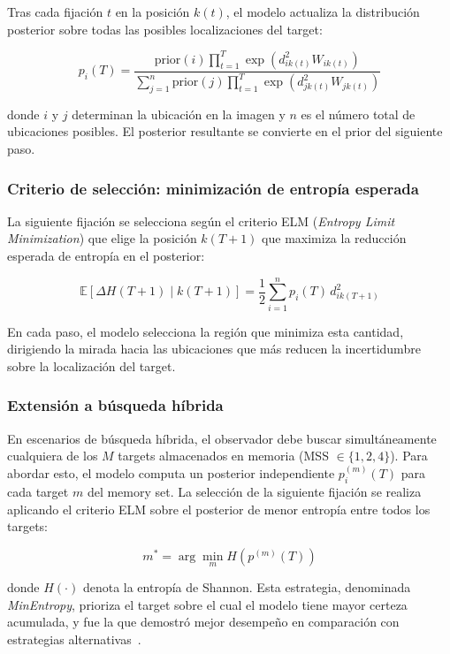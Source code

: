 Tras cada fijación $t$ en la posición $k(t)$, el modelo actualiza 
la distribución posterior sobre todas las posibles localizaciones 
del target:

\begin{equation}
    p_i(T) = \frac{\text{prior}(i) \prod_{t=1}^{T} \exp\left(d^2_{ik(t)} 
    W_{ik(t)}\right)}{\sum_{j=1}^{n} \text{prior}(j) \prod_{t=1}^{T} 
    \exp\left(d^2_{jk(t)} W_{jk(t)}\right)}
    \label{eq:posterior}
\end{equation}

\noindent donde $i$ y $j$ determinan la ubicación en la imagen y $n$ es 
el número total de ubicaciones posibles. El posterior resultante se 
convierte en el prior del siguiente paso.

\subsubsection{Criterio de selección: minimización de entropía esperada}

La siguiente fijación se selecciona según el criterio ELM
(\textit{Entropy Limit Minimization}) que 
elige la posición $k(T+1)$ que maximiza la reducción esperada de 
entropía en el posterior:

\begin{equation}
    \mathbb{E}[\Delta H(T+1) \mid k(T+1)] = \frac{1}{2} \sum_{i=1}^{n} 
    p_i(T)\, d^2_{ik(T+1)}
    \label{eq:elm}
\end{equation}

En cada paso, el modelo selecciona la región que minimiza esta 
cantidad, dirigiendo la mirada hacia las ubicaciones que más reducen 
la incertidumbre sobre la localización del target.

\subsubsection{Extensión a búsqueda híbrida}

En escenarios de búsqueda híbrida, el observador debe buscar simultáneamente 
cualquiera de los $M$ targets almacenados en memoria 
(MSS $\in \{1, 2, 4\}$). Para abordar esto, el modelo computa un 
posterior independiente $p_i^{(m)}(T)$ para cada target $m$ del 
memory set. La selección de la siguiente fijación se realiza 
aplicando el criterio ELM sobre el posterior de menor entropía 
entre todos los targets:

\begin{equation}
    m^* = \arg\min_{m} H\left(p^{(m)}(T)\right)
\end{equation}

\noindent donde $H(\cdot)$ denota la entropía de Shannon. Esta 
estrategia, denominada \textit{MinEntropy}, prioriza el target sobre 
el cual el modelo tiene mayor certeza acumulada, y fue la que
demostró mejor desempeño en comparación con estrategias alternativas~\citep{ruarte2025}.